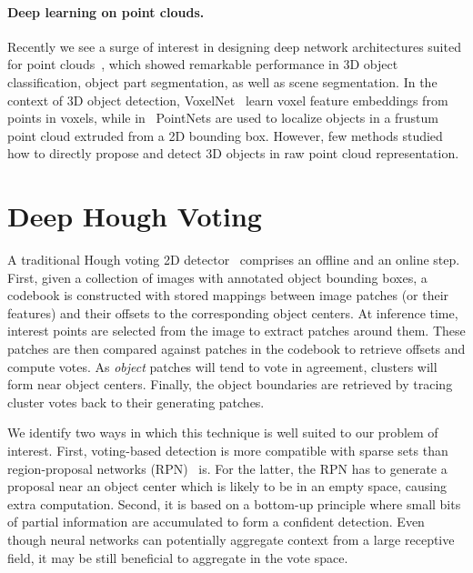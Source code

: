 \documentclass[10pt,twocolumn,letterpaper]{article}
\begin{document}
\paragraph{Deep learning on point clouds.}
Recently we see a surge of interest in designing deep network architectures suited for point clouds~\cite{qi2017pointnet, qi2017pointnetplusplus, su2018splatnet, atzmon2018point, li2018pointcnn, graham20183d, wang2017cnn, tatarchenko2017octree,tatarchenko2018tangent,le2018pointgrid,klokov2017escape,yang2018foldingnet,xu2018spidercnn,wang2018dynamic,xie2018attentional}, which showed remarkable performance in 3D object classification, object part segmentation, as well as scene segmentation. In the context of 3D object detection, VoxelNet~\cite{zhou2018voxelnet} learn voxel feature embeddings from points in voxels, while in~\cite{qi2018frustum} PointNets are used to localize objects in a frustum point cloud extruded from a 2D bounding box. However, few methods studied how to directly propose and detect 3D objects in raw point cloud representation.











 
\section{Deep Hough Voting}
\label{sec:deep_hough_voting}


A traditional Hough voting 2D detector~\cite{leibe2008robust} comprises an offline and an online step. First, given a collection of images with annotated object bounding boxes, a codebook is constructed with stored mappings between image patches (or their features) and their offsets to the corresponding object centers.  
At inference time, interest points are selected from the image to extract patches around them. These patches are then compared against patches in the codebook to retrieve offsets and compute votes. As \textit{object} patches will tend to vote in agreement, clusters will form near object centers. Finally, the object boundaries are retrieved by tracing cluster votes back to their generating patches. 



We identify two ways in which this technique is well suited to our problem of interest.
First, voting-based detection is more compatible with sparse sets than region-proposal networks (RPN)~\cite{ren2015faster} is. For the latter, the RPN has to generate a proposal near an object center which is likely to be in an empty space, causing extra computation.
Second, it is based on a bottom-up principle where small bits of partial information are accumulated to form a confident detection. Even though neural networks can potentially aggregate context from a large receptive field, it may be still beneficial to aggregate in the vote space. 
\end{document}
